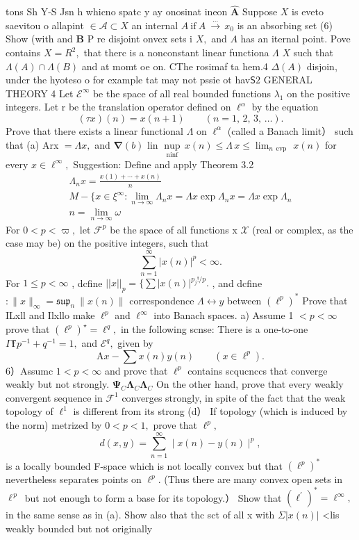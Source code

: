 tons Sh Y-S Jsn h whicno spatc y ay onosinat ineon $\mathbf{\hat{A}}$ Suppose $\textstyle X$ is eveto saevitou o allapint $\in{\mathcal{A}}\subset X$ an internal $A\ {\mathrm{if~}}A\ {\stackrel{...}{\to}}\,x_{0}$ is an absorbing set (6) Show (with and $\boldsymbol{B}$ P re disjoint onvex sets i $X,$ and $\scriptstyle{A}$ has an iternal point. Pove contains $X=R^{2},$ that therc is a nonconstant linear functiona $\Lambda$ $\textstyle X$ such that $\Lambda(A)\cap\Lambda(B)$ and at momt oe on. CThe rosimaf ta hem.4 $\Delta(A)$ disjoin, undcr the hyoteso o for example tat may not pssie ot hav${\mathsf{S}}2$ GENERAL THEORY 4 Let ${\mathcal{E}}^{\infty}$ be the space of all real bounded functions $\lambda_{1}$ on the positive integers. Let r be the translation operator defined on $\ell^{\alpha}$ by the equation $$ (\tau x)(n)=x(n+1)\qquad(n=1,\,2,\,3,\,\dots). $$ Prove that there exists a linear functional $\Lambda$ on $\ell^{\alpha}$ (called a Banach limit） such that (a) Arx $=\Lambda x,$ and $\mathbf{\nabla}(b)$ lin ${\underset{\mathrm{ninf}}{\operatorname{nup}}}\,x(n)\leq\Lambda\,x\leq\operatorname*{lim}_{n\,\operatorname{evp}}\,x(n)$ for every $x\in\ell^{\infty},$ Suggestion: Define and apply Theorem 3.2 $$ \begin{array}{c}{{\Lambda_{n}x=\frac{x(1)+\cdots+x(n)}{n}}}\\ {{M-\{x\in\xi^{\infty}:\operatorname*{lim}_{n\to\infty}\Lambda_{n}x=\Lambda x\exp\Lambda_{n}x=\Lambda x\exp\Lambda_{n}}}\\ {{n=\operatorname*{lim}_{n\to\infty}\omega}}\end{array} $$ For $0<p<\varpi,$ let ${\mathcal{F}}^{p}$ be the space of all functions x $\scriptstyle{\mathcal{X}}$ (real or complex, as the case may be) on the positive integers, such that $$ \sum_{n=1}^{\infty}|x(n)|^{p}<\infty. $$ For $1\leq p<\infty$ , dcfine $||x||_{p}=\{\sum|x(n)|^{p_{j}!/p}.$ , and dcfine $:\|x\|_{\infty}={\mathfrak{s u p}}_{n}~\|x(n)\|$ correspondence $\Lambda{\longleftrightarrow}y$ between $(\ell^{p})^{*}$ Prove that ILxll and Ilxllo make $\ell^{p}$ and $\ell^{\infty}$ into Banach spaces. a) Assume 1 $<p<\infty$ prove that $(\ell^{p})^{\star}=\ell^{q},$ in the following scnse: There is a one-to-one $\Gamma\mathbf{f}\,p^{-1}+q^{-1}=1,$ and ${\mathcal{E}}^{q},$ given by $$ \mathrm{A}x-\sum x(n)y(n)\qquad(x\in\ell^{p}). $$ 6）Assumc $1<p<\infty$ and provc that $\ell^{p}$ contains scqucnccs that converge weakly but not strongly. $\mathbf{\Psi}_{C}\mathbf{\Lambda}_{C}\mathbf{\Lambda}_{C}$ On the other hand, prove that every weakly convergent sequence in ${\mathcal{F}}^{1}$ converges strongly, in spite of the fact that the weak topology of $\ell^{1}$ is different from its strong (d） If topology (which is induced by the norm) metrized by $0<p<1,$ prove that $\ell^{p},$ $$ d(x,y)=\sum_{n=1}^{\infty}\mid x(n)-y(n)\mid^{p}, $$ is a locally bounded F-space which is not locally convex but that $(\ell^{p})^{\ast}$ nevertheless separates points on $\ell^{p}.$ (Thus there are many convex open sets in $\ell^{\,p\ }$ but not enough to form a base for its topology.） Show that $(\ell^{\prime})^{*}=\ell^{\infty},$ in the same sense as in (a). Show also that thc sct of all x with $\Sigma|x(n)|$ <lis weakly boundcd but not originally 